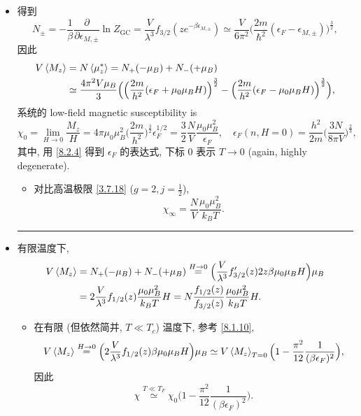 \begin{itemize}
	\item 得到
	\begin{equation} \label{8.2.4}
		N_{\pm} = - \frac{1}{\beta} \frac{\partial}{\partial \epsilon_{M, \pm}} \ln Z_\text{GC} = \frac{V}{\lambda^3} f_{3 / 2}(z e^{- \beta \epsilon_{M, \pm}}) \simeq \frac{V}{6 \pi^2} \Big( \frac{2 m}{\hbar^2} (\epsilon_F - \epsilon_{M, \pm}) \Big)^{\frac{3}{2}},
	\end{equation}
	因此
	\begin{align}
		V \braket{M_z} &= N \braket{\mu^*_z} = N_+ (- \mu_B) + N_- (+ \mu_B) \notag \\
		&\simeq \frac{4 \pi^2 V \mu_B}{3} \Big( \Big( \frac{2 m}{h^2} (\epsilon_F + \mu_0 \mu_B H) \Big)^{\frac{3}{2}} - \Big( \frac{2 m}{h^2} (\epsilon_F - \mu_0 \mu_B H) \Big)^{\frac{3}{2}} \Big),
	\end{align}
	系统的 low-field magnetic susceptibility is
	\begin{equation}
		\chi_0 = \lim_{H \rightarrow 0} \frac{M_z}{H} = 4 \pi \mu_0 \mu_B^2 \Big( \frac{2 m}{h^2} \Big)^{\frac{3}{2}} \epsilon_F^{1 / 2} = \frac{3}{2} \frac{N}{V} \frac{\mu_0 \mu_B^2}{\epsilon_F}, \quad \epsilon_F(n, H = 0) = \frac{h^2}{2 m} \Big( \frac{3 N}{8 \pi V} \Big)^{\frac{2}{3}},
	\end{equation}
	其中, 用 \eqref{8.2.4} 得到 $\epsilon_F$ 的表达式, 下标 $0$ 表示 $T \rightarrow 0$ (again, highly degenerate).
	
	\begin{itemize}
		\item 对比高温极限 \eqref{3.7.18} ($g = 2, j = \frac{1}{2}$),
		\begin{equation}
			\chi_\infty = \frac{N}{V} \frac{\mu_0 \mu_B^2}{k_B T}.
		\end{equation}
	\end{itemize}
	
	\noindent\rule[0.5ex]{\linewidth}{0.5pt} %
	
	\item 有限温度下,
	\begin{align}
		V \braket{M_z} &= N_+ (- \mu_B) + N_- (+ \mu_B) \overset{H \rightarrow 0}{=} \Big( \frac{V}{\lambda^3} f'_{3 / 2}(z) 2 z \beta \mu_0 \mu_B H \Big) \mu_B \notag \\
		&= 2 \frac{V}{\lambda^3} f_{1 / 2}(z) \frac{\mu_0 \mu_B^2}{k_B T} H = N \frac{f_{1 / 2}(z)}{f_{3 / 2}(z)} \frac{\mu_0 \mu_B^2}{k_B T} H.
	\end{align}
	\begin{itemize}
		\item 在有限 (但依然简并, $T \ll T_c$) 温度下, 参考 \eqref{8.1.10},
		\begin{equation}
			V \braket{M_z} \overset{H \rightarrow 0}{=} \Big( 2 \frac{V}{\lambda^3} f_{1 / 2}(z) \beta \mu_0 \mu_B H \Big) \mu_B \simeq V \braket{M_z}_{T = 0} \Big( 1 - \frac{\pi^2}{12} \frac{1}{(\beta \epsilon_F)^2} \Big),
		\end{equation}
		因此
		\begin{equation}
			\chi \overset{T \ll T_F}{\simeq} \chi_0 \Big( 1 - \frac{\pi^2}{12} \frac{1}{(\beta \epsilon_F)^2} \Big).
		\end{equation}
		

\end{itemize}
\end{itemize}
